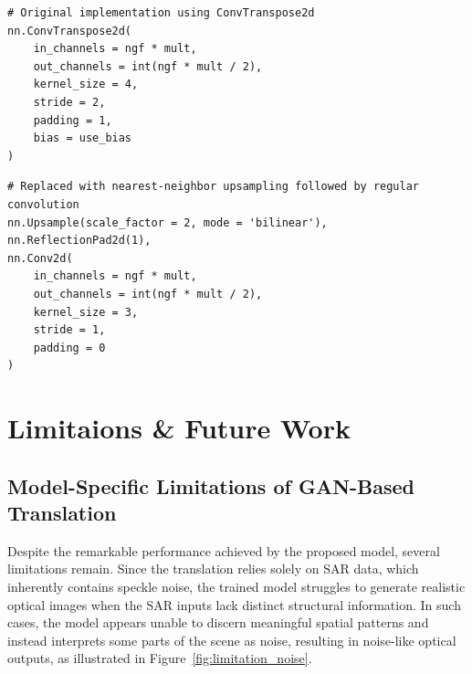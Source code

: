 \begin{lstlisting}[caption={Original transposed convolution block in Pix2Pix}, label={lst:original_convtranspose}]
# Original implementation using ConvTranspose2d
nn.ConvTranspose2d(
    in_channels = ngf * mult,
    out_channels = int(ngf * mult / 2),
    kernel_size = 4,
    stride = 2,
    padding = 1,
    bias = use_bias
)
\end{lstlisting}

\begin{lstlisting}[caption={Modified resize-conv block to mitigate checkerboard artifacts}, label={lst:resize_conv}]
# Replaced with nearest-neighbor upsampling followed by regular convolution
nn.Upsample(scale_factor = 2, mode = 'bilinear'),
nn.ReflectionPad2d(1),
nn.Conv2d(
    in_channels = ngf * mult,
    out_channels = int(ngf * mult / 2),
    kernel_size = 3,
    stride = 1,
    padding = 0
)
\end{lstlisting}


\chapter{Limitaions \& Future Work}

\section{Model-Specific Limitations of GAN-Based Translation}
Despite the remarkable performance achieved by the proposed model, several limitations remain. Since the translation relies solely on SAR data, which inherently contains speckle noise, the trained model struggles to generate realistic optical images when the SAR inputs lack distinct structural information. In such cases, the model appears unable to discern meaningful spatial patterns and instead interprets some parts of the scene as noise, resulting in noise-like optical outputs, as illustrated in Figure~\ref{fig:limitation_noise}.

